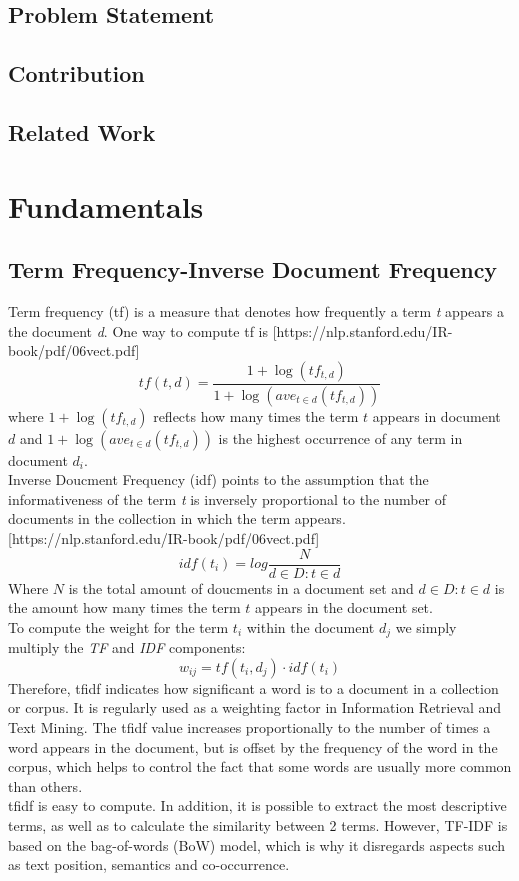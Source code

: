 \documentclass[a4paper, 11pt,titlepage,oneside,openany]{book}
\begin{document}
\section{Problem Statement}
 
 

\section{Contribution}

 

\section{Related Work}

\chapter{Fundamentals}

\section{Term Frequency-Inverse Document Frequency}
Term frequency (\gls{tf}) is a measure that denotes how frequently a term \textit{t} appears a the document \textit{d}. One way to compute \gls{tf} is [https://nlp.stanford.edu/IR-book/pdf/06vect.pdf]\\
\[
tf(t,d)=\frac{1+\log(tf_{t,d})}{1+\log(ave_{t\in d}(tf_{t,d}))}
\]
where $1+\log(tf_{t,d})$ reflects how many times the term $t$ appears in document $d$ and $1+\log(ave_{t\in d}(tf_{t,d}))$ is the highest occurrence of any term in document $d_i$.\\

\noindent Inverse Doucment Frequency (\gls{idf}) points to the assumption that the informativeness of the term \textit{t} is inversely proportional to the number of documents in the collection in which the term appears.[https://nlp.stanford.edu/IR-book/pdf/06vect.pdf]\\
\[
idf(t_i)=log\frac{N}{d \in D : t \in d}
\]
Where $N$ is the total amount of doucments in a document set and $d \in D : t \in d$ is the amount how many times the term $t$ appears in the document set.\\

\noindent To compute the weight for the term $t_i$ within the document $d_j$ we simply multiply the \textit{TF} and \textit{IDF} components:
\[
w_{ij}=tf(t_i, d_j)\cdot idf(t_i)
\]
Therefore, \Gls{tfidf} indicates how significant a word is to a document in a collection or corpus. It is regularly used as a weighting factor in Information Retrieval and Text Mining. The \Gls{tfidf} value increases proportionally to the number of times a word appears in the document, but is offset by the frequency of the word in the corpus, which helps to control the fact that some words are usually more common than others.\\
\noindent \Gls{tfidf} is easy to compute. In addition, it is possible to extract the most descriptive terms, as well as to calculate the similarity between 2 terms. However, TF-IDF is based on the bag-of-words (BoW) model, which is why it disregards aspects such as text position, semantics and co-occurrence.
\end{document}
